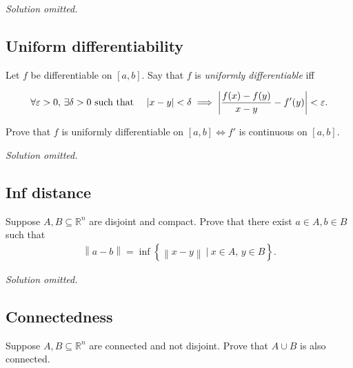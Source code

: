 \emph{Solution omitted.}

\hypertarget{uniform-differentiability}{%
\subsection{Uniform differentiability}\label{uniform-differentiability}}

\begin{problem}[?]

Let \(f\) be differentiable on \([a, b]\). Say that \(f\) is
\emph{uniformly differentiable} iff

\begin{align*}  
\forall \varepsilon > 0,\, \exists \delta > 0 \text{ such that } \quad {\left\lvert {x-y} \right\rvert} < \delta \implies {\left\lvert { {f(x) - f(y) \over x-y}  - f'(y)} \right\rvert}  < {\varepsilon}
.\end{align*}

Prove that \(f\) is uniformly differentiable on \([a, b] \iff f'\) is
continuous on \([a, b]\).

\end{problem}

\emph{Solution omitted.}

\hypertarget{inf-distance}{%
\subsection{Inf distance}\label{inf-distance}}

\begin{problem}[?]

Suppose \(A, B \subseteq {\mathbb{R}}^n\) are disjoint and compact.
Prove that there exist \(a\in A, b\in B\) such that
\begin{align*}  
{\left\lVert {a - b} \right\rVert} = \inf\left\{{{\left\lVert {x-y} \right\rVert} {~\mathrel{\Big\vert}~}x\in A,\, y\in B}\right\}
.\end{align*}

\end{problem}

\emph{Solution omitted.}

\hypertarget{connectedness}{%
\subsection{Connectedness}\label{connectedness}}

\begin{problem}[?]

Suppose \(A, B\subseteq {\mathbb{R}}^n\) are connected and not disjoint.
Prove that \(A\cup B\) is also connected.

\end{problem}

